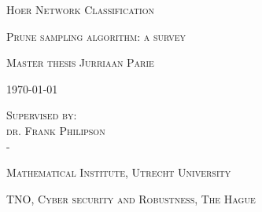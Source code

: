 \documentclass[a4paper, twoside, 11pt]{report}
\theoremstyle{plain}
\theoremstyle{definition}
\theoremstyle{remark}
\begin{document}






\begin{titlepage}
	\centering
	\vspace{1cm}

	{
		\huge
		\textsc{Hoer Network Classification}
	}
	
	\vspace{0.25cm}
	
	{
		\large
		\textsc{Prune sampling algorithm: a survey}
	}

	\vspace{1.5cm}

	{
		\Large
		\textsc{Master thesis Jurriaan Parie}
	}

	\vspace{1cm}

	{
		\large
		\textsc{\today}
	}
	
		\vspace{2cm}
	
	{
		\large
		\textsc{Supervised by: \\
		dr. Frank Philipson\\
		-}
	}
	
	\vspace{3cm}
	
	{
		\large
		\textsc{Mathematical Institute, Utrecht University}
	}
		
	\vspace{0.5cm}
		
	{
		\large
		\textsc{TNO, Cyber security and Robustness, The Hague}
	}
	
	\vspace{2cm}
%	
	
\end{titlepage}


\pagestyle{plain}





\end{document}
